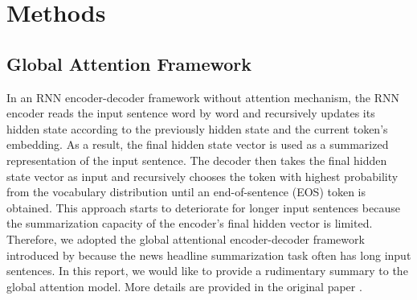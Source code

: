 \section{Methods}
\label{sec: method}

\subsection{Global Attention Framework}
In an RNN encoder-decoder framework without attention mechanism, the RNN encoder reads the input sentence word by word and recursively updates its hidden state according to the previously hidden state and the current token's embedding.
As a result, the final hidden state vector is used as a summarized representation of the input sentence.
The decoder then takes the final hidden state vector as input and recursively chooses the token with highest probability from the vocabulary distribution until an end-of-sentence (EOS) token is obtained. This approach starts to deteriorate for longer input sentences because the summarization capacity of the encoder's final hidden vector is limited. 
Therefore, we adopted the global attentional encoder-decoder framework introduced by \cite{luong2015effective} because the news headline summarization task often has long input sentences. In this report, we would like to provide a rudimentary summary to the global attention model. More details are provided in the original paper \cite{luong2015effective}. 

